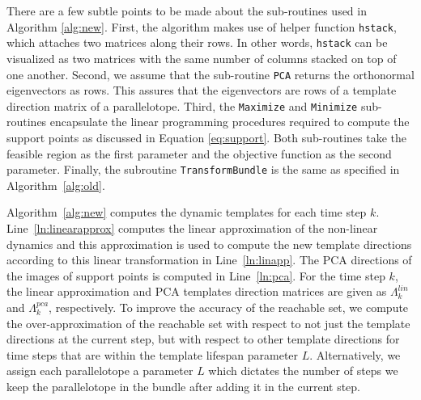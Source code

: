 There are a few subtle points to be made about the sub-routines used in Algorithm \ref{alg:new}.
%
First, the algorithm makes use of helper function \texttt{hstack}, which attaches two matrices along their rows. In other words, \texttt{hstack} can be visualized as two matrices with the same number of columns stacked on top of one another.
%
Second, we assume that the sub-routine  \texttt{PCA} returns the orthonormal eigenvectors as rows. This assures that the eigenvectors are rows of a template direction matrix of a parallelotope.
%
Third, the \texttt{Maximize} and \texttt{Minimize} sub-routines encapsulate the linear programming procedures required to compute the support points as discussed in Equation \ref{eq:support}.
%
Both sub-routines take the feasible region as the first parameter and the objective function as the second parameter.
%
 Finally, the subroutine \texttt{TransformBundle} is the same as specified in Algorithm~\ref{alg:old}.



Algorithm~\ref{alg:new} computes the dynamic templates for each time step $k$.
%
Line~\ref{ln:linearapprox} computes the linear approximation of the non-linear dynamics and this approximation is used to compute the new template directions according to this linear transformation in Line~\ref{ln:linapp}.
%
The PCA directions of the images of support points is computed in Line~\ref{ln:pca}.
%
For the time step $k$, the linear approximation and PCA templates direction matrices are given as $\Lambda_{k}^{lin}$ and $\Lambda_{k}^{pca}$, respectively.
%
To improve the accuracy of the reachable set, we compute the over-approximation of the reachable set with respect to not just the template directions at the current step, but with respect to other template directions for time steps that are within the template lifespan parameter $L$.
%
Alternatively, we assign each parallelotope a parameter $L$ which dictates the number of steps we keep the parallelotope in the bundle after adding it in the current step.
